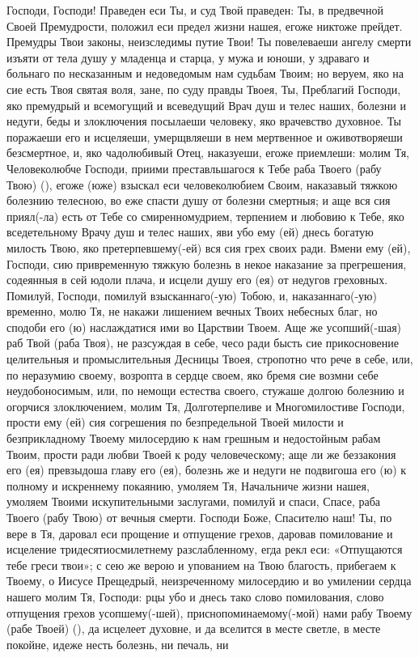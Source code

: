\mychapterending


\begin{mymulticols}
 


Господи, Господи! Праведен еси Ты, и суд Твой праведен: Ты, в предвечной Своей Премудрости, положил еси предел жизни нашея, егоже никтоже прейдет. Премудры Твои законы, неизследимы путие Твои! Ты повелеваеши ангелу смерти изъяти от тела душу у младенца и старца, у мужа и юноши, у здраваго и больнаго по несказанным и недоведомым нам судьбам Твоим; но веруем, яко на сие есть Твоя святая воля, зане, по суду правды Твоея, Ты, Преблагий Господи, яко премудрый и всемогущий и всеведущий Врач душ и телес наших, болезни и недуги, беды и злоключения посылаеши человеку, яко врачевство духовное. Ты поражаеши его и исцеляеши, умерщвляеши в нем мертвенное и оживотворяеши безсмертное, и, яко чадолюбивый Отец, наказуеши, егоже приемлеши: молим Тя, Человеколюбче Господи, приими преставльшагося к Тебе раба Твоего (рабу Твою) (), егоже (юже) взыскал еси человеколюбием Своим, наказавый тяжкою болезнию телесною, во еже спасти душу от болезни смертныя; и аще вся сия приял(-ла) есть от Тебе со смиренномудрием, терпением и любовию к Тебе, яко вседетельному Врачу душ и телес наших, яви убо ему (ей) днесь богатую милость Твою, яко претерпевшему(-ей) вся сия грех своих ради. Вмени ему (ей), Господи, сию привременную тяжкую болезнь в некое наказание за прегрешения, содеянныя в сей юдоли плача, и исцели душу его (ея) от недугов греховных. Помилуй, Господи, помилуй взысканнаго(-ую) Тобою, и, наказаннаго(-ую) временно, молю Тя, не накажи лишением вечных Твоих небесных благ, но сподоби его (ю) наслаждатися ими во Царствии Твоем. Аще же усопший(-шая) раб Твой (раба Твоя), не разсуждая в себе, чесо ради бысть сие прикосновение целительныя и промыслительныя Десницы Твоея, стропотно что рече в себе, или, по неразумию своему, возропта в сердце своем, яко бремя сие возмни себе неудобоносимым, или, по немощи естества своего, стужаше долгою болезнию и огорчися злоключением, молим Тя, Долготерпеливе и Многомилостиве Господи, прости ему (ей) сия согрешения по безпредельной Твоей милости и безприкладному Твоему милосердию к нам грешным и недостойным рабам Твоим, прости ради любви Твоей к роду человеческому; аще ли же беззакония его (ея) превзыдоша главу его (ея), болезнь же и недуги не подвигоша его (ю) к полному и искреннему покаянию, умоляем Тя, Начальниче жизни нашея, умоляем Твоими искупительными заслугами, помилуй и спаси, Спасе, раба Твоего (рабу Твою) от вечныя смерти. Господи Боже, Спасителю наш! Ты, по вере в Тя, даровал еси прощение и отпущение грехов, даровав помилование и исцеление тридесятиосмилетнему разслабленному, егда рекл еси: «Отпущаются тебе греси твои»; с сею же верою и упованием на Твою благость, прибегаем к Твоему, о Иисусе Прещедрый, неизреченному милосердию и во умилении сердца нашего молим Тя, Господи: рцы убо и днесь тако слово помилования, слово отпущения грехов усопшему(-шей), приснопоминаемому(-мой) нами рабу Твоему (рабе Твоей) (), да исцелеет духовне, и да вселится в месте светле, в месте покойне, идеже несть болезнь, ни печаль, ни 
\end{mymulticols}
